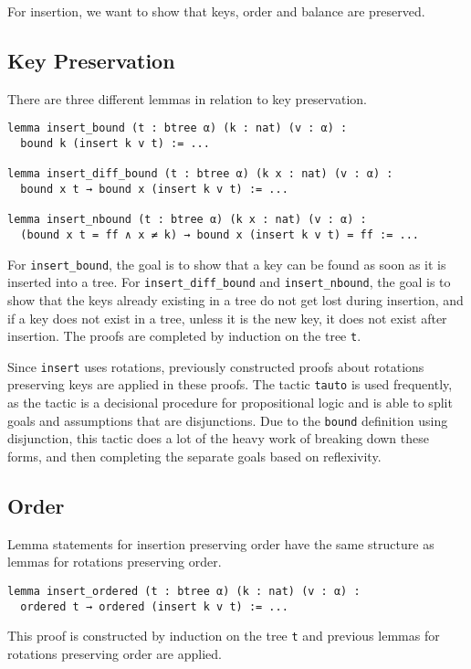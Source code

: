 For insertion, we want to show that keys, order and balance are preserved.

\subsection*{Key Preservation}
There are three different lemmas in relation to key preservation.

\begin{lstlisting}
lemma insert_bound (t : btree α) (k : nat) (v : α) :
  bound k (insert k v t) := ...

lemma insert_diff_bound (t : btree α) (k x : nat) (v : α) :
  bound x t → bound x (insert k v t) := ...

lemma insert_nbound (t : btree α) (k x : nat) (v : α) :
  (bound x t = ff ∧ x ≠ k) → bound x (insert k v t) = ff := ...
\end{lstlisting}

For \lstinline{insert_bound}, the goal is to show that a key can be found as soon as it is inserted into a tree. For \lstinline{insert_diff_bound} and \lstinline{insert_nbound}, the goal is to show that the keys already existing in a tree do not get lost during insertion, and if a key does not exist in a tree, unless it is the new key, it does not exist after insertion. The proofs are completed by induction on the tree \lstinline{t}.

Since \lstinline{insert} uses rotations, previously constructed proofs about rotations preserving keys are applied in these proofs. The tactic \lstinline{tauto} is used frequently, as the tactic is a decisional procedure for propositional logic and is able to split goals and assumptions that are disjunctions. Due to the \lstinline{bound} definition using disjunction, this tactic does a lot of the heavy work of breaking down these forms, and then completing the separate goals based on reflexivity.

\subsection*{Order}
Lemma statements for insertion preserving order have the same structure as lemmas for rotations preserving order.

\begin{lstlisting}
lemma insert_ordered (t : btree α) (k : nat) (v : α) :
  ordered t → ordered (insert k v t) := ...
\end{lstlisting}

This proof is constructed by induction on the tree \lstinline{t} and previous lemmas for rotations preserving order are applied. 

